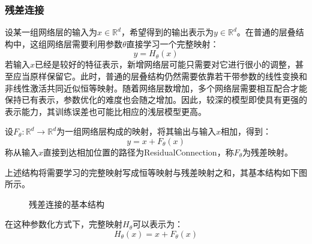 \subsubsection{残差连接}
设某一组网络层的输入为$x\in\mathbb{R}^d$，希望得到的输出表示为$y\in\mathbb{R}^d$。在普通的层叠结构中，这组网络层需要利用参数$\theta$直接学习一个完整映射：
\begin{equation*}
	y=H_\theta(x)
\end{equation*}
若输入$x$已经是较好的特征表示，新增网络层可能只需要对它进行很小的调整，甚至应当原样保留它。此时，普通的层叠结构仍然需要依靠若干带参数的线性变换和非线性激活共同近似恒等映射。随着网络层数增加，多个网络层需要相互配合才能保持已有表示，参数优化的难度也会随之增加。因此，较深的模型即使具有更强的表示能力，其训练误差也可能比相应的浅层模型更高。
\begin{definition}
	设$F_\theta:\mathbb{R}^d\to\mathbb{R}^d$为一组网络层构成的映射，将其输出与输入$x$相加，得到：
	\begin{equation*}
		y=x+F_\theta(x)
	\end{equation*}
	称从输入$x$直接到达相加位置的路径为\gls{ResidualConnection}，称$F_\theta$为残差映射。
\end{definition}
上述结构将需要学习的完整映射写成恒等映射与残差映射之和，其基本结构如下图所示。
\begin{figure}[H]
	\centering
	\caption{残差连接的基本结构}
\end{figure}
在这种参数化方式下，完整映射$H_\theta$可以表示为：
\begin{equation*}
	H_\theta(x)=x+F_\theta(x)
\end{equation*}
